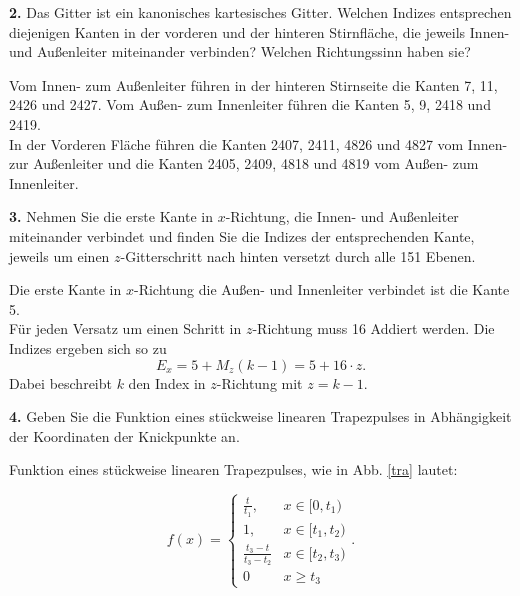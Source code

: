 \documentclass[Protokollheft.tex]{subfiles}
\begin{document}
\begin{framed}
	\noindent \textbf{2.} Das Gitter ist ein kanonisches kartesisches Gitter. Welchen
Indizes entsprechen diejenigen Kanten in der vorderen und der hinteren
Stirnfläche, die jeweils Innen- und Außenleiter miteinander
verbinden? Welchen Richtungssinn haben sie?\label{exer:idxConductorInterconnection}
\end{framed}

Vom Innen- zum Außenleiter führen in der hinteren Stirnseite die Kanten 7, 11, 2426 und 2427. Vom Außen- zum Innenleiter führen die Kanten 5, 9, 2418 und 2419. \\
In der Vorderen Fläche führen die Kanten 2407, 2411, 4826 und 4827 vom Innen- zur Außenleiter
und die Kanten 2405, 2409, 4818 und 4819 vom Außen- zum Innenleiter. 
\begin{framed}
	\noindent \textbf{3.} Nehmen Sie die erste Kante in $x$-Richtung, die Innen- und Außenleiter
miteinander verbindet und finden Sie die Indizes der
entsprechenden Kante, jeweils um einen $z$-Gitterschritt nach
hinten versetzt durch alle 151 Ebenen.\label{exer:idxEdge4allZ}
\end{framed}
\noindent
Die erste Kante in $x$-Richtung die Außen- und Innenleiter verbindet ist die Kante 5. \\
Für jeden Versatz um einen Schritt in $z$-Richtung muss 16 Addiert werden. Die Indizes ergeben sich so zu 
\begin{equation}
	E_x = 5+M_z(k-1) = 5 + 16\cdot z.
\end{equation}
Dabei beschreibt $k$ den Index in $z$-Richtung mit $z=k-1$.
\begin{framed}
	\noindent \textbf{4.} Geben Sie die Funktion eines stückweise linearen
Trapezpulses in Abhängigkeit der Koordinaten der Knickpunkte an.\label{exer:calcPiecewiseTrapezoidal}
\end{framed}

Funktion eines stückweise linearen Trapezpulses, wie in Abb. \ref{tra}  lautet:

$$
f(x)=\left\{
\begin{array}{ll} \frac{t}{t_1}, & x\in [0,t_1) \\
1, & x\in [t_1,t_2) \\
\frac{t_3-t}{t_3-t_2} & x\in [t_2,t_3)\\
0 & x\geq t_3

\end{array}\right. .
$$
\end{document}
